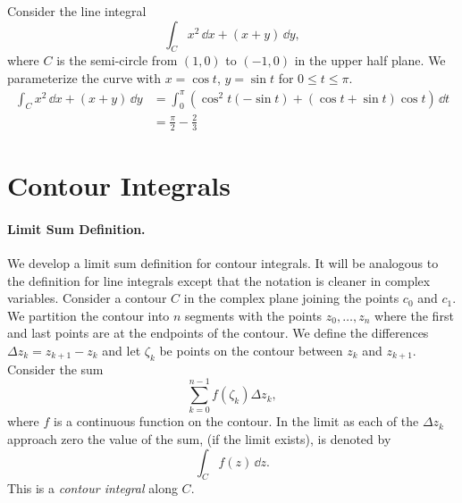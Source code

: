 \begin{Example}
  Consider the line integral
  \[
  \int_C x^2 \,\dd x + (x+y)\,\dd y,
  \]
  where $C$ is the semi-circle from $(1,0)$ to $(-1,0)$ in the upper 
  half plane.  We parameterize the curve with $x = \cos t$, $y = \sin t$ for 
  $0 \leq t \leq \pi$.
  \begin{align*}
    \int_C x^2 \,\dd x + (x+y)\,\dd y
    &= \int_0^\pi \left( \cos^2 t (-\sin t) + (\cos t + \sin t) \cos t
    \right)\,\dd t 
    \\
    &= \frac{\pi}{2} - \frac{2}{3}
  \end{align*}
\end{Example}
















\section{Contour Integrals}



\paragraph{Limit Sum Definition.}
We develop a limit sum definition for contour integrals.  
It will be analogous to the definition for line integrals 
except that the notation is cleaner in complex variables.
Consider a contour $C$ in the complex plane joining the points $c_0$
and $c_1$.  We partition the contour into $n$ segments with the points
$z_0, \ldots, z_n$ where the first and last points are at
the endpoints of the contour.  We define the differences $\Delta z_k = z_{k+1} - z_k$
and let $\zeta_k$ be points on the 
contour between $z_k$ and $z_{k+1}$.  Consider the sum
\[
\sum_{k = 0}^{n-1} f(\zeta_k) \Delta z_k,
\]
where $f$ is a continuous function on the contour.
In the limit as each of the $\Delta z_k$ approach zero
the value of the sum, (if the limit exists), is denoted by
\[
\int_C f(z) \,\dd z.
\]
This is a \textit{contour integral} along $C$.

